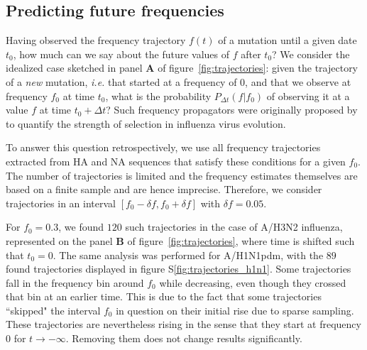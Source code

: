 \documentclass[reprint,amsmath,amssymb,superscriptaddress,showpacs,rmp]{revtex4-1}
\newcommand{\sref}[1]{S\ref{#1}}
\begin{document}

\subsection*{Predicting future frequencies}
Having observed the frequency trajectory $f(t)$ of a mutation until a given date $t_0$, how much can we say about the future values of $f$ after $t_0$?
We consider the idealized case sketched in panel \textbf{A} of figure~\ref{fig:trajectories}: given the trajectory of a \emph{new} mutation, \emph{i.e.} that started at a frequency of 0, and that we observe at frequency $f_0$ at time $t_0$, what is the probability $P_{\Delta t}(f\vert f_0)$ of observing it at a value $f$ at time $t_0 + \Delta t$?
Such frequency propagators were originally proposed by \citep{strelkowa_clonal_2012} to quantify the strength of selection in influenza virus evolution.

To answer this question retrospectively, we use all frequency trajectories extracted from HA and NA sequences that satisfy these conditions for a given $f_0$.  The number of trajectories is limited and the frequency estimates themselves are based on a finite sample and are hence imprecise.
Therefore, we consider trajectories in an interval $[f_0-\delta f, f_0+\delta f]$ with $\delta f = 0.05$.

For $f_0=0.3$, we found $120$ such trajectories in the case of A/H3N2 influenza, represented on the panel \textbf{B} of figure~\ref{fig:trajectories}, where time is shifted such that $t_0 = 0$. The same analysis was performed for A/H1N1pdm, with the $89$ found trajectories displayed in figure \sref{fig:trajectories_h1n1}.
Some trajectories fall in the frequency bin around $f_0$ while decreasing, even though they crossed that bin at an earlier time.
This is due to the fact that some trajectories ``skipped" the interval $f_0$ in question on their initial rise due to sparse sampling.
These trajectories are nevertheless rising in the sense that they start at frequency 0 for $t\rightarrow -\infty$.
Removing them does not change results significantly.
\end{document}
